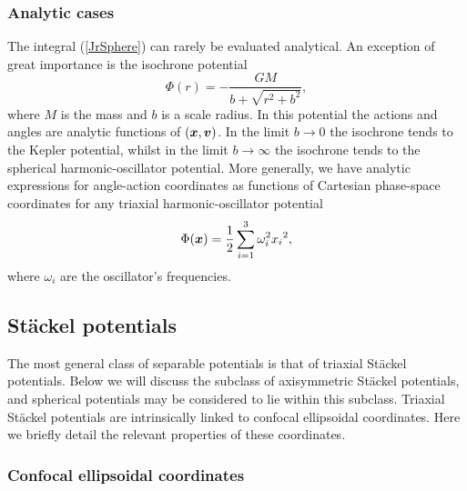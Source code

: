 \documentclass[useAMS,usenatbib,fleqn,a4paper]{mn2e}
\newcommand{\bs}[1]{\bmath{#1}}
\begin{document}
\subsubsection{Analytic cases}\label{Sect::analytic}

The integral (\ref{JrSphere}) can rarely be evaluated analytical.
An exception of great importance  is the isochrone
potential \citep{Henon}
\begin{equation}
\Phi(r) = -\frac{GM}{b+\sqrt{r^2+b^2}},
\end{equation}
 where $M$ is the mass and $b$ is a scale radius. In this potential the
actions and angles are analytic functions of $(\bs{x},\bs{v})$. In the limit
$b\rightarrow0$ the isochrone tends to the Kepler potential, whilst in the
limit $b\rightarrow\infty$ the isochrone tends to the spherical
harmonic-oscillator potential.  More generally, we have analytic expressions
for angle-action coordinates as functions of Cartesian phase-space coordinates
for any triaxial harmonic-oscillator potential
\begin{equation}
\Phi(\bs{x}) = \frac{1}{2}\sum_{i=1}^3\omega_i^2{x_i}^2,
\end{equation}
where $\omega_i$ are the oscillator's frequencies.


\subsection{St\"ackel potentials}\label{StackelPot}

The most general class of separable potentials is that of triaxial St\"ackel
potentials. Below we will discuss the subclass of axisymmetric St\"ackel
potentials, and spherical potentials may be considered to lie within this
subclass. Triaxial St\"ackel potentials are intrinsically linked to confocal
ellipsoidal coordinates. Here we briefly detail the relevant properties of
these coordinates.

\subsubsection{Confocal ellipsoidal coordinates}
\end{document}
